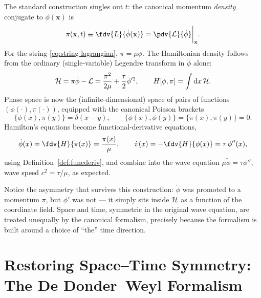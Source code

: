 The standard construction singles out $t$: the canonical momentum
\emph{density} conjugate to $\phi(\mathbf{x})$ is
\begin{equation}
\pi(\mathbf{x},t) \equiv \fdv{L}{\dot\phi(\mathbf{x})} = 
    \pdv{\Lag}{\dot\phi}\bigg|_{\mathbf{x}}.
\end{equation}
For the string \eqref{eq:string-lagrangian}, $\pi = \mu\dot\phi$. The
Hamiltonian density follows from the ordinary (single-variable) Legendre
transform in $\dot\phi$ alone:
\begin{equation}
\mathcal{H} = \pi\dot\phi - \mathcal{L} = \frac{\pi^2}{2\mu} + \frac{\tau}{2}\phi'^2 ,
\qquad
H[\phi,\pi] = \int \mathrm{d} x\, \mathcal{H} .
\end{equation}
Phase space is now the (infinite-dimensional) space of pairs of functions
$(\phi(\cdot),\pi(\cdot))$, equipped with the canonical Poisson brackets
\begin{equation}
\{\phi(x),\pi(y)\} = \delta(x-y), \qquad \{\phi(x),\phi(y)\}=\{\pi(x),\pi(y)\}=0.
\label{eq:canonical-pb}
\end{equation}
Hamilton's equations become functional-derivative equations,
\begin{equation}
\dot\phi(x) = \fdv{H}{\pi(x)} = \frac{\pi(x)}{\mu}, \qquad
\dot\pi(x) = -\fdv{H}{\phi(x)} = \tau\,\phi''(x),
\end{equation}
using Definition~\ref{def:funcderiv}, and combine into the wave equation
$\mu\ddot\phi=\tau\phi''$, wave speed $c^2=\tau/\mu$, as expected.

Notice the asymmetry that survives this construction: $\dot\phi$ was promoted
to a momentum $\pi$, but $\phi'$ was not --- it simply sits inside $\mathcal{H}$ as a
function of the coordinate field. Space and time, symmetric in the original
wave equation, are treated unequally by the canonical formalism, precisely
because the formalism is built around a choice of ``the'' time direction.

\section{Restoring Space--Time Symmetry: The De Donder--Weyl Formalism}
\label{sec:dw}

